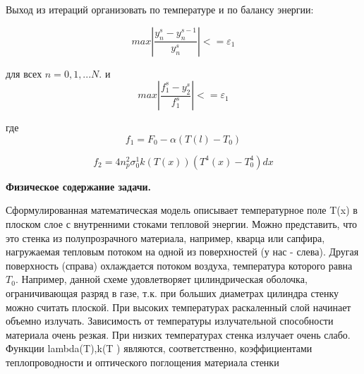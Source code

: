 \documentclass[a4paper,oneside,12pt]{extreport}
\begin{document}
Выход из итераций организовать по температуре и по балансу энергии:

\begin{equation*}
	max|\frac{y^s_n - y^{s-1}_n}{y^s_n}| <= \varepsilon_{1}
\end{equation*} 

\indent для всех $n = 0, 1, ... N.$ и \\

\begin{equation*}
	max|\frac{f^s_1 - y^s_2}{f^s_1}| <= \varepsilon_{1}
\end{equation*}

где \\

\begin{equation*}
	f_{1} = F_0 - \alpha(T(l) - T_{0})
\end{equation*}

\begin{equation*}
	f_{2}  = 4n^2_p \sigma ^1_0 k(T(x))(T^4(x) - T^4_0) dx
\end{equation*}

\textbf{Физическое содержание задачи.} 

Сформулированная математическая модель описывает температурное поле T(x)
в плоском слое с внутренними стоками тепловой энергии. Можно представить, что это
стенка из полупрозрачного материала, например, кварца или сапфира, 
нагружаемая тепловым потоком на одной из поверхностей (у нас - слева). Другая поверхность (справа)
охлаждается потоком воздуха, температура которого равна $T_0$. Например, данной схеме
удовлетворяет цилиндрическая оболочка, ограничивающая разряд в газе, т.к. при больших
диаметрах цилиндра стенку можно считать плоской. При высоких температурах раскаленный слой начинает объемно излучать.
Зависимость от температуры излучательной способности материала очень резкая. При низких температурах стенка излучает очень слабо.
Функции lambda(T),k(T ) являются, соответственно, коэффициентами теплопроводности и оптического поглощения материала стенки

\newpage 
\end{document}
